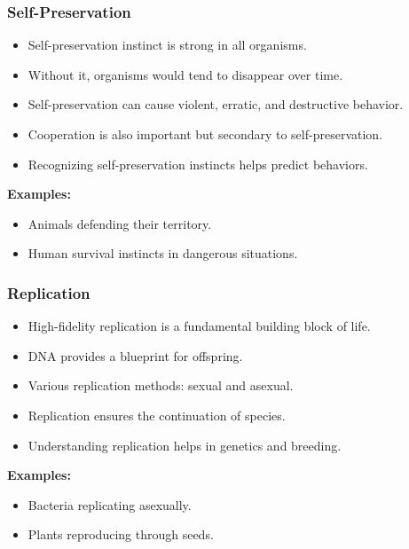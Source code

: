\begin{frame}[fragile]\frametitle{Self-Preservation}
\begin{itemize}
    \item Self-preservation instinct is strong in all organisms.
    \item Without it, organisms would tend to disappear over time.
    \item Self-preservation can cause violent, erratic, and destructive behavior.
    \item Cooperation is also important but secondary to self-preservation.
    \item Recognizing self-preservation instincts helps predict behaviors.
\end{itemize}
\textbf{Examples:}
\begin{itemize}
    \item Animals defending their territory.
    \item Human survival instincts in dangerous situations.
\end{itemize}
\end{frame}

\begin{frame}[fragile]\frametitle{Replication}
\begin{itemize}
    \item High-fidelity replication is a fundamental building block of life.
    \item DNA provides a blueprint for offspring.
    \item Various replication methods: sexual and asexual.
    \item Replication ensures the continuation of species.
    \item Understanding replication helps in genetics and breeding.
\end{itemize}
\textbf{Examples:}
\begin{itemize}
    \item Bacteria replicating asexually.
    \item Plants reproducing through seeds.
\end{itemize}
\end{frame}

